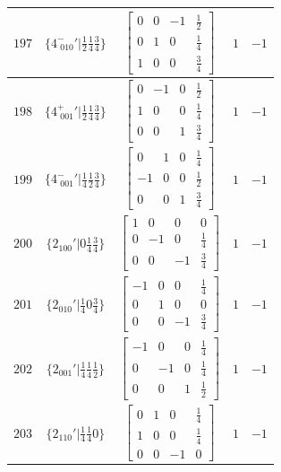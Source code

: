 \documentclass[fleqn,8pt]{jsarticle}
\begin{document}
\begin{longtable}{ccccc}
$ 197 $ & $ \{4^{-}_{\,\,010}{}'|\frac{1}{2} \frac{1}{4} \frac{3}{4}\} $ & $ \begin{bmatrix} 0 & 0 & -1 & \frac{1}{2} \\ 0 & 1 & 0 & \frac{1}{4} \\ 1 & 0 & 0 & \frac{3}{4} \end{bmatrix} $ & $ 1 $ & $ -1 $ \\ \hline
$ 198 $ & $ \{4^{+}_{\,\,001}{}'|\frac{1}{2} \frac{1}{4} \frac{3}{4}\} $ & $ \begin{bmatrix} 0 & -1 & 0 & \frac{1}{2} \\ 1 & 0 & 0 & \frac{1}{4} \\ 0 & 0 & 1 & \frac{3}{4} \end{bmatrix} $ & $ 1 $ & $ -1 $ \\ \hline
$ 199 $ & $ \{4^{-}_{\,\,001}{}'|\frac{1}{4} \frac{1}{2} \frac{3}{4}\} $ & $ \begin{bmatrix} 0 & 1 & 0 & \frac{1}{4} \\ -1 & 0 & 0 & \frac{1}{2} \\ 0 & 0 & 1 & \frac{3}{4} \end{bmatrix} $ & $ 1 $ & $ -1 $ \\ \hline
$ 200 $ & $ \{2{}_{100}{}'|0 \frac{1}{4} \frac{3}{4}\} $ & $ \begin{bmatrix} 1 & 0 & 0 & 0 \\ 0 & -1 & 0 & \frac{1}{4} \\ 0 & 0 & -1 & \frac{3}{4} \end{bmatrix} $ & $ 1 $ & $ -1 $ \\ \hline
$ 201 $ & $ \{2{}_{010}{}'|\frac{1}{4} 0 \frac{3}{4}\} $ & $ \begin{bmatrix} -1 & 0 & 0 & \frac{1}{4} \\ 0 & 1 & 0 & 0 \\ 0 & 0 & -1 & \frac{3}{4} \end{bmatrix} $ & $ 1 $ & $ -1 $ \\ \hline
$ 202 $ & $ \{2{}_{001}{}'|\frac{1}{4} \frac{1}{4} \frac{1}{2}\} $ & $ \begin{bmatrix} -1 & 0 & 0 & \frac{1}{4} \\ 0 & -1 & 0 & \frac{1}{4} \\ 0 & 0 & 1 & \frac{1}{2} \end{bmatrix} $ & $ 1 $ & $ -1 $ \\ \hline
$ 203 $ & $ \{2{}_{110}{}'|\frac{1}{4} \frac{1}{4} 0\} $ & $ \begin{bmatrix} 0 & 1 & 0 & \frac{1}{4} \\ 1 & 0 & 0 & \frac{1}{4} \\ 0 & 0 & -1 & 0 \end{bmatrix} $ & $ 1 $ & $ -1 $ \\ \hline

\end{longtable}
\end{document}
